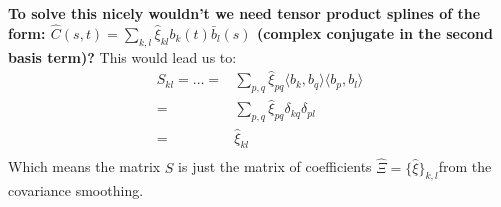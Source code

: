 \textbf{To solve this nicely wouldn't we need tensor product splines of the form: $\hat{C}(s,t) = \sum_{k,l} \hat{\xi}_{kl} b_k(t) \bar{b}_l(s)$ (complex conjugate in the second basis term)?} This would lead us to:
\begin{align*}
  S_{kl} = \dots =& \sum_{p,q} \hat{\xi}_{pq} \langle b_k, b_q \rangle \langle b_p, b_l \rangle \\
  =& \sum_{p,q} \hat{\xi}_{pq} \delta_{kq} \delta_{pl} \\
  =& \hat{\xi}_{kl}\\
\end{align*}
Which means the matrix $S$ is just the matrix of coefficients $\hat{\Xi} = \{\hat{\xi}\}_{k,l} $from the covariance smoothing.
